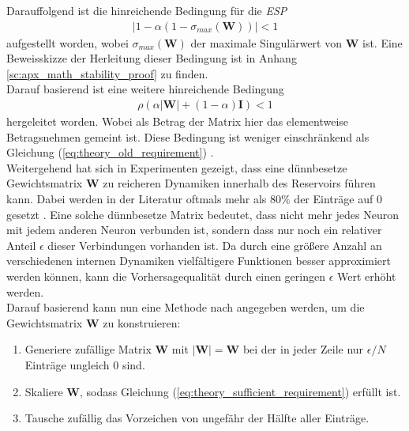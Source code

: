 Darauffolgend ist die hinreichende Bedingung für die \textit{ESP}
\begin{align}
\label{eq:theory_old_requirement}
|1-\alpha(1-\sigma_{max}(\mathbf{W}))| < 1
\end{align}
aufgestellt worden, wobei $\sigma_{max}(\mathbf{W})$ der maximale Singulärwert von $\mathbf{W}$ ist. Eine Beweisskizze der Herleitung dieser Bedingung ist in Anhang \ref{sc:apx_math_stability_proof} zu finden.\\

Darauf basierend ist eine weitere hinreichende Bedingung
\begin{align}
\label{eq:theory_sufficient_requirement}
\rho(\alpha |\mathbf{W}|+(1-\alpha) \mathbf{I}) < 1
\end{align}
hergeleitet worden. Wobei als Betrag der Matrix hier das elementweise Betragsnehmen gemeint ist. Diese Bedingung ist weniger einschränkend als Gleichung (\ref{eq:theory_old_requirement}) \cite{yildiz}.\\


Weitergehend hat sich in Experimenten gezeigt, dass eine dünnbesetze Gewichtsmatrix $\mathbf{W}$ zu reicheren Dynamiken innerhalb des Reservoirs führen kann. Dabei werden in der Literatur oftmals mehr als $80\%$ der Einträge auf $0$ gesetzt \citep{jaeger2010}. Eine solche dünnbesetze Matrix bedeutet, dass nicht mehr jedes Neuron mit jedem anderen Neuron verbunden ist, sondern dass nur noch ein relativer Anteil $\epsilon$ dieser Verbindungen vorhanden ist. Da durch eine größere Anzahl an verschiedenen internen Dynamiken vielfältigere Funktionen besser approximiert werden können, kann die Vorhersagequalität durch einen geringen $\epsilon$ Wert erhöht werden.\\

Darauf basierend kann nun eine Methode nach \cite{yildiz} angegeben werden, um die Gewichtsmatrix $\mathbf{W}$ zu konstruieren:

\singlespacing
\begin{enumerate}
	\item Generiere zufällige Matrix $\mathbf{W}$ mit $\mathbf{|W|} = \mathbf{W}$ bei der in jeder Zeile nur $\epsilon/N$ Einträge ungleich $0$ sind.
	\item Skaliere $\mathbf{W}$, sodass Gleichung (\ref{eq:theory_sufficient_requirement}) erfüllt ist.
	\item Tausche zufällig das Vorzeichen von ungefähr der Hälfte aller Einträge.
\end{enumerate}
\onehalfspacing

